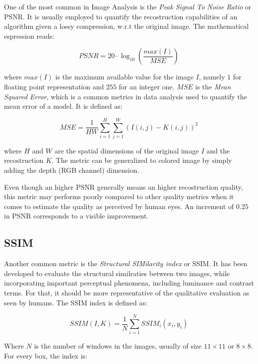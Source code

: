 \documentclass[12pt,a4paper]{report}
\begin{document}
One of the most common in Image Analysis is the {\it Peak Signal To Noise Ratio} or PSNR. 
It is usually employed to quantify the recostruction capabilities of an algorithm given a lossy compression, w.r.t the original image. The mathematical espression reads: 

\begin{equation}
 PSNR = 20 \cdot \log_{10} (\frac{max(I)}{MSE})
\end{equation}

where $max(I)$ is the maximum available value for the image $I$, namely $1$ for floating point representation and $255$ for an integer one. 
$MSE$ is the {\it Mean Squared Error}, which is a common metrics in data analysis used to quantify the mean error of a model. It is defined as:

\begin{equation}
 MSE = \frac{1}{HW}\sum_{i=1}^{H} \sum_{j=1}^W (I(i, j) - K(i,j))^2
\end{equation}
 
where $H$ and $W$ are the spatial dimensions of the original image $I$ and the recostruction $K$. 
The metric can be generalized to colored image by simply adding the depth (RGB channel) dimension.

Even though an higher PSNR generally means an higher recostruction quality, this metric may performs poorly compared to other quality metrics when it comes to estimate the quality as perceived by human eyes. An increment of $0.25$ in PSNR corresponds to a visible improvement.
 
\subsection*{SSIM}

Another common metric is the {\it Structural SIMilarity index} or SSIM. It has been developed to evaluate the structural similraties between two images,  while incorporating important perceptual phenomena, including luminance and contrast terms. For that, it should be more representative of the qualitative evaluation as seen by humans.
The SSIM index is defined as: 

\begin{equation}
 SSIM(I, K) = \frac{1}{N} \sum_{i=1}^{N} SSIM_i(x_i, y_i)
\end{equation}

Where $N$ is the number of windows in the images, usually of size $11 \times 11$ or $8 \times 8$. For every box, the index is: 
\end{document}
